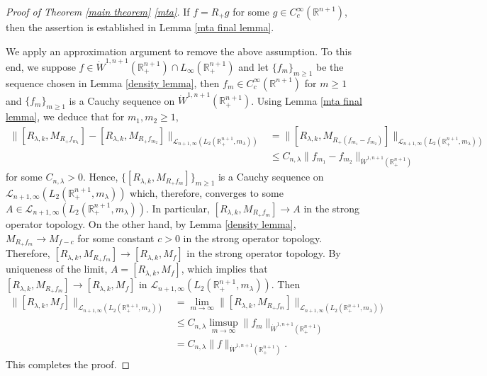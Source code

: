\documentclass[12pt]{amsart}
\begin{document}
\begin{proof}[Proof of Theorem \ref{main theorem} \eqref{mta}] If $f=R_+g$ for some $g\in C_c^\infty(\mathbb{R}^{n+1})$, then the assertion is established in Lemma \ref{mta final lemma}.
	
We apply an approximation argument to remove the above assumption. To this end, we suppose $f\in  \dot{W}^{1,n+1}(\mathbb{R}_+^{n+1})\cap L_{\infty}(\mathbb{R}_+^{n+1})$ and let $\{f_m\}_{m\geq 1}$ be the sequence chosen in Lemma \ref{density lemma}, then $f_m\in C_c^\infty(\mathbb{R}^{n+1})$ for $m\geq 1$ and $\{f_m\}_{m\geq 1}$ is a Cauchy sequence on $\dot{W}^{1,n+1}(\mathbb{R}_+^{n+1})$. Using Lemma \ref{mta final lemma}, we deduce that for $m_1,m_2\geq1$,
\begin{align*}
\|[R_{\lambda,k},M_{R_+f_{m_1}}]-[R_{\lambda,k},M_{R_+f_{m_2}}]\|_{\mathcal{L}_{n+1,\infty}(L_2(\mathbb{R}^{n+1}_+,m_{\lambda}))}&=\|[R_{\lambda,k},M_{R_+(f_{m_1}-f_{m_2})}]\|_{\mathcal{L}_{n+1,\infty}(L_2(\mathbb{R}^{n+1}_+,m_{\lambda}))}\\
&\leq C_{n,\lambda}\|f_{m_1}-f_{m_2}\|_{\dot{W}^{1,n+1}(\mathbb{R}_+^{n+1})}
\end{align*}
for some $C_{n,\lambda}>0$.
Hence, $\{[R_{\lambda,k},M_{R_+f_{m}}]\}_{m\geq 1}$ is a Cauchy sequence on $\mathcal{L}_{n+1,\infty}(L_2(\mathbb{R}^{n+1}_+,m_{\lambda}))$ which, therefore, converges to some $A\in \mathcal{L}_{n+1,\infty}(L_2(\mathbb{R}^{n+1}_+,m_{\lambda})).$ In particular, $[R_{\lambda,k},M_{R_+f_{m}}]\rightarrow A$ in the strong operator topology. On the other hand, by Lemma \ref{density lemma}, $M_{R_+f_m}\rightarrow M_{f-c}$ for some constant $c>0$ in the strong operator topology. Therefore, $[R_{\lambda,k},M_{R_+f_m}]\rightarrow [R_{\lambda,k},M_f]$ in the strong operator topology. By uniqueness of the limit, $A=[R_{\lambda,k},M_f]$, which implies that  $[R_{\lambda,k},M_{R_+f_m}]\rightarrow [R_{\lambda,k},M_f]$ in $\mathcal{L}_{n+1,\infty}(L_2(\mathbb{R}^{n+1}_+,m_{\lambda})).$ Then
\begin{align*}
\|[R_{\lambda,k},M_f]\|_{\mathcal{L}_{n+1,\infty}(L_2(\mathbb{R}^{n+1}_+,m_{\lambda}))}&=\lim_{m\rightarrow \infty}\|[R_{\lambda,k},M_{R_+f_m}]\|_{\mathcal{L}_{n+1,\infty}(L_2(\mathbb{R}^{n+1}_+,m_{\lambda}))}\\
&\leq C_{n,\lambda}\limsup_{m\rightarrow \infty}\|f_m\|_{\dot{W}^{1,n+1}(\mathbb{R}_+^{n+1})}\\
&=C_{n,\lambda}\|f\|_{\dot{W}^{1,n+1}(\mathbb{R}_+^{n+1})}.
\end{align*}
This completes the proof.
\end{proof}
\end{document}
